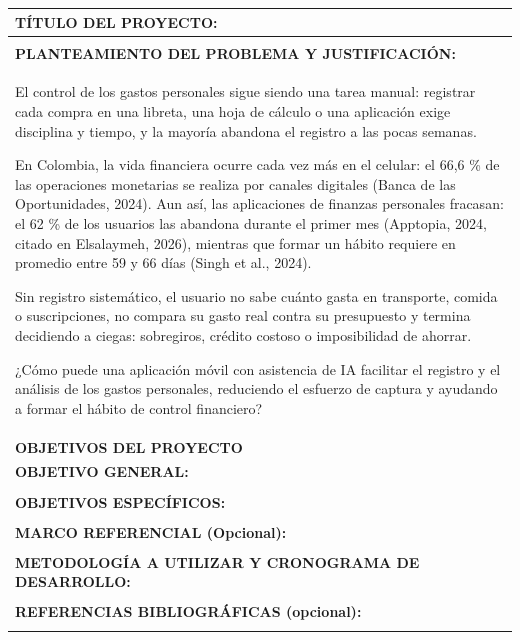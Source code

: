 \documentclass[11pt]{article}
\newcommand{\formlabel}[1]{\textbf{\small #1}}
\newcommand{\formcell}[1]{\small #1}
\begin{document}
\noindent
\begin{tabular}{|p{15.38cm}|}
\hline
\formlabel{TÍTULO DEL PROYECTO:} \\
\hline
\rule{0pt}{0.62cm} \\
\hline
\formlabel{PLANTEAMIENTO DEL PROBLEMA Y JUSTIFICACIÓN:} \\
\hline
\formcell{El control de los gastos personales sigue siendo una tarea manual: registrar cada compra en una libreta, una hoja de cálculo o una aplicación exige disciplina y tiempo, y la mayoría abandona el registro a las pocas semanas.

En Colombia, la vida financiera ocurre cada vez más en el celular: el 66,6 \% de las operaciones monetarias se realiza por canales digitales (Banca de las Oportunidades, 2024). Aun así, las aplicaciones de finanzas personales fracasan: el 62 \% de los usuarios las abandona durante el primer mes (Apptopia, 2024, citado en Elsalaymeh, 2026), mientras que formar un hábito requiere en promedio entre 59 y 66 días (Singh et al., 2024).

Sin registro sistemático, el usuario no sabe cuánto gasta en transporte, comida o suscripciones, no compara su gasto real contra su presupuesto y termina decidiendo a ciegas: sobregiros, crédito costoso o imposibilidad de ahorrar.

¿Cómo puede una aplicación móvil con asistencia de IA facilitar el registro y el análisis de los gastos personales, reduciendo el esfuerzo de captura y ayudando a formar el hábito de control financiero?} \\
\hline
\formlabel{OBJETIVOS DEL PROYECTO} \\
\hline
\formlabel{OBJETIVO GENERAL:} \\
\hline
\rule{0pt}{0.62cm} \\
\hline
\formlabel{OBJETIVOS ESPECÍFICOS:} \\
\hline
\rule{0pt}{0.62cm} \\
\hline
\formlabel{MARCO REFERENCIAL (Opcional):} \\
\hline
\rule{0pt}{0.62cm} \\
\hline
\formlabel{METODOLOGÍA A UTILIZAR Y CRONOGRAMA DE DESARROLLO:} \\
\hline
\rule{0pt}{0.62cm} \\
\hline
\formlabel{REFERENCIAS BIBLIOGRÁFICAS (opcional):} \\
\hline
\rule{0pt}{0.62cm} \\
\hline
\end{tabular}
\end{document}
